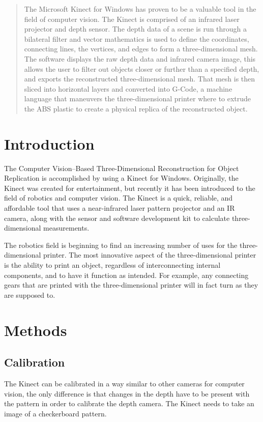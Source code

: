 \documentclass[pdftex,10.5pt]{report}
\begin{document}


\begin{abstract}
The Microsoft Kinect for Windows has proven to be a valuable tool in the field of computer vision. The Kinect is comprised of an infrared laser projector and depth sensor. The depth data of a scene is run through a bilateral filter and vector mathematics is used to define the coordinates, connecting lines, the vertices, and edges to form a three-dimensional mesh. The software displays the raw depth data and infrared camera image, this allows the user to filter out objects closer or further than a specified depth, and exports the reconstructed three-dimensional mesh. That mesh is then sliced into horizontal layers and converted into G-Code, a machine language that maneuvers the three-dimensional printer where to extrude the ABS plastic to create a physical replica of the reconstructed object. 
\end{abstract}
\tableofcontents



\section{Introduction}
The Computer Vision--Based Three-Dimensional Reconstruction for Object Replication is accomplished by using a Kinect for Windows. Originally, the Kinect was created for entertainment, but recently it has been introduced to the field of robotics and computer vision. The Kinect is a quick, reliable, and affordable tool that uses a near-infrared laser pattern projector and an IR camera, along with the sensor and software development kit to calculate three-dimensional measurements.

The robotics field is beginning to find an increasing number of uses for the three-dimensional printer. The most innovative aspect of the three-dimensional printer is the ability to print an object, regardless of interconnecting internal components, and to have it function as intended. For example, any connecting gears that are printed with the three-dimensional printer will in fact turn as they are supposed to.

\section{Methods}
\subsection{Calibration}
The Kinect can be calibrated in a way similar to other cameras for computer vision, the only difference is that changes in the depth have to be present  with the pattern in order to calibrate the depth camera. The Kinect needs to take an image of a checkerboard pattern.
\end{document}
